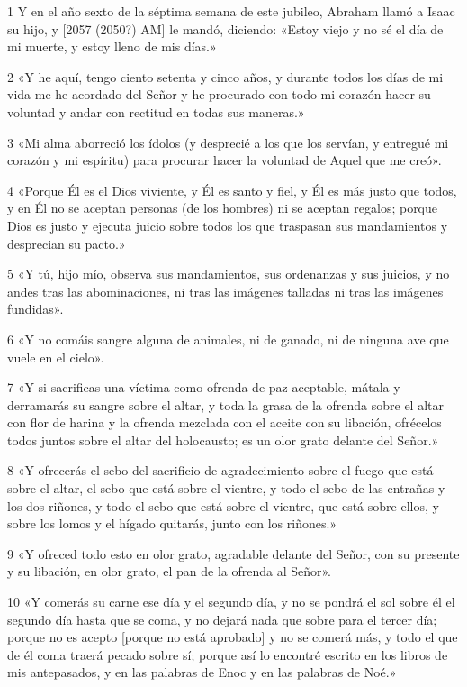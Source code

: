 \par 1 Y en el año sexto de la séptima semana de este jubileo, Abraham llamó a Isaac su hijo, y [2057 (2050?) AM] le mandó, diciendo: «Estoy viejo y no sé el día de mi muerte, y estoy lleno de mis días.»
\par 2 «Y he aquí, tengo ciento setenta y cinco años, y durante todos los días de mi vida me he acordado del Señor y he procurado con todo mi corazón hacer su voluntad y andar con rectitud en todas sus maneras.»
\par 3 «Mi alma aborreció los ídolos (y desprecié a los que los servían, y entregué mi corazón y mi espíritu) para procurar hacer la voluntad de Aquel que me creó».
\par 4 «Porque Él es el Dios viviente, y Él es santo y fiel, y Él es más justo que todos, y en Él no se aceptan personas (de los hombres) ni se aceptan regalos; porque Dios es justo y ejecuta juicio sobre todos los que traspasan sus mandamientos y desprecian su pacto.»
\par 5 «Y tú, hijo mío, observa sus mandamientos, sus ordenanzas y sus juicios, y no andes tras las abominaciones, ni tras las imágenes talladas ni tras las imágenes fundidas».
\par 6 «Y no comáis sangre alguna de animales, ni de ganado, ni de ninguna ave que vuele en el cielo».
\par 7 «Y si sacrificas una víctima como ofrenda de paz aceptable, mátala y derramarás su sangre sobre el altar, y toda la grasa de la ofrenda sobre el altar con flor de harina y la ofrenda mezclada con el aceite con su libación, ofrécelos todos juntos sobre el altar del holocausto; es un olor grato delante del Señor.»
\par 8 «Y ofrecerás el sebo del sacrificio de agradecimiento sobre el fuego que está sobre el altar, el sebo que está sobre el vientre, y todo el sebo de las entrañas y los dos riñones, y todo el sebo que está sobre el vientre, que está sobre ellos, y sobre los lomos y el hígado quitarás, junto con los riñones.»
\par 9 «Y ofreced todo esto en olor grato, agradable delante del Señor, con su presente y su libación, en olor grato, el pan de la ofrenda al Señor».
\par 10 «Y comerás su carne ese día y el segundo día, y no se pondrá el sol sobre él el segundo día hasta que se coma, y ​​no dejará nada que sobre para el tercer día; porque no es acepto [porque no está aprobado] y no se comerá más, y todo el que de él coma traerá pecado sobre sí; porque así lo encontré escrito en los libros de mis antepasados, y en las palabras de Enoc y en las palabras de Noé.»
